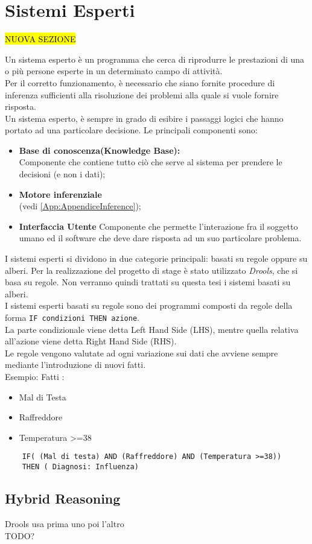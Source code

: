 \section{Sistemi Esperti}
\hl{NUOVA SEZIONE}
 \label{App:AppendiceSistemiEsperti}
 
 Un sistema esperto è un programma che cerca di riprodurre le prestazioni di una o più persone esperte in un determinato campo di attività. \\
 Per il corretto funzionamento, è necessario che siano fornite procedure di inferenza sufficienti alla risoluzione dei problemi alla quale si vuole fornire risposta. \\
 Un sistema esperto, è sempre in grado di esibire i passaggi logici che hanno portato ad una particolare decisione.
 Le principali componenti sono: 
 \begin{itemize}
 	\item \textbf{Base di conoscenza(Knowledge Base):}\\
	 	Componente che contiene tutto ciò che serve al sistema per prendere le decisioni (e non i dati); 
	\item \textbf{Motore inferenziale}\\
	  (vedi \autoref{App:AppendiceInference});
	\item \textbf{Interfaccia Utente}
		Componente che permette l'interazione fra il soggetto umano ed il software che deve dare risposta ad un suo particolare problema.
 \end{itemize}
 
 
 I sistemi esperti si dividono in due categorie principali: basati su regole oppure su alberi. 
 Per la realizzazione del progetto di stage è stato utilizzato \textit{Drools}, che si basa su regole. Non verranno quindi trattati su questa tesi i sistemi basati su alberi.\\
 I sistemi esperti basati su regole sono dei programmi composti da regole della forma \texttt{IF condizioni THEN azione}.\\
  La parte condizionale viene detta Left Hand Side (LHS), mentre quella relativa all'azione viene detta Right Hand Side (RHS).\\
 Le regole vengono valutate ad ogni variazione sui dati che avviene sempre mediante l'introduzione di nuovi fatti.\\
 Esempio:
	 Fatti :
	 \begin{itemize}
	 	\item Mal di Testa
	 	\item Raffreddore
	 	\item Temperatura >=38
	 \end{itemize}
 \begin{lstlisting}
	IF( (Mal di testa) AND (Raffreddore) AND (Temperatura >=38))
	THEN ( Diagnosi: Influenza)
 \end{lstlisting}

 
 



 \subsection{Hybrid Reasoning}
 Drools usa prima uno poi l'altro \textcite{eco:tesi} \\
 TODO?